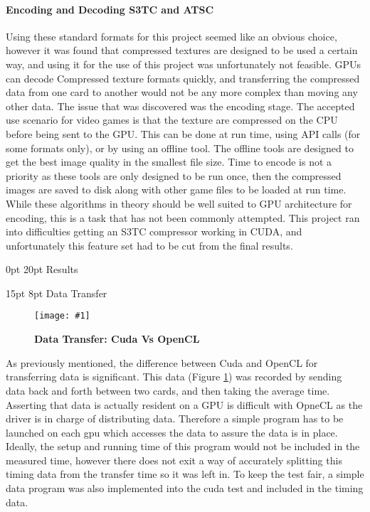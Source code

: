 \documentclass[12pt,a4paper]{article}
\makeatletter
\newcommand{\figuremacroWHN}[3]{
	\begin{figure}[h!] %
		\centering
		\texttt{[image: \#1]}
		\caption[#2]{\textbf{#2}}
		\label{fig:#1}
	\end{figure}
}
\renewcommand\subsection{\@startsection {subsection}{1}{2mm} %
                               {15pt} %
                               {8pt} %
                               {\fontsize{13pt}{1em}\bfseries}}
\renewcommand\section{\@startsection {section}{1}{0mm} %
                               {0pt} %
                               {20pt} %
                               {\fontsize{14pt}{1em}\bfseries\newpage}}
\makeatother
\begin{document}
\paragraph{Encoding and Decoding S3TC and ATSC}
Using these standard formats for this project seemed like an obvious choice, however it was found that compressed textures are designed to be used a certain way, and using it for the use of this project was unfortunately not feasible.
GPUs can decode Compressed texture formats quickly, and transferring the compressed data from one card to another would not be any more complex than moving any other data. The issue that was discovered was the encoding stage. The accepted use scenario for video games is that the texture are compressed on the CPU before being sent to the GPU. This can be done at run time, using API calls (for some formats only), or by using an offline tool. The offline tools are designed to get the best image quality in the smallest file size. Time to encode is not a priority as these tools are only designed to be run once, then the compressed images are saved to disk along with other game files to be loaded at run time.
While these algorithms in theory should be well suited to GPU architecture for encoding, this is a task that has not been commonly attempted. This project ran into difficulties getting an S3TC compressor working in CUDA, and  unfortunately this feature set had to be cut from the final results. 

\section{Results}

\subsection{Data Transfer}

\figuremacroWHN
{DataTransferCudaUVAVSOpenCL}
{Data Transfer: Cuda Vs OpenCL}
{1.0}
As previously mentioned, the difference between Cuda and OpenCL for transferring data is significant. This data (Figure \ref{fig:DataTransferCudaUVAVSOpenCL}) was recorded by sending data back and forth between two cards, and then taking the average time. 
Asserting that data is actually resident on a GPU is difficult with OpneCL as the driver is in charge of distributing data. 
Therefore a simple program has to be launched on each gpu which accesses the data to assure the data is in place.
Ideally, the setup and running time of this program would not be included in the measured time, however there does not exit a way of accurately splitting this timing data from the transfer time so it was left in. 
To keep the test fair, a simple data program was also implemented into the cuda test and included in the timing data.
\end{document}
